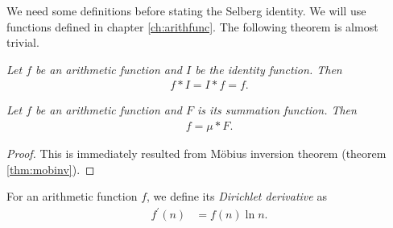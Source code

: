 \documentclass{subfile}
\begin{document}
	We need some definitions before stating the Selberg identity. We will use functions defined in chapter \eqref{ch:arithfunc}. The following theorem is almost trivial.
	\begin{theorem}\slshape
		Let $f$ be an arithmetic function and $I$ be the identity function. Then
			\begin{align*}
				f\ast I=I\ast f=f.
			\end{align*}
	\end{theorem}

	\begin{theorem}\slshape
		\label{thm:dirichmobi}
		Let $f$ be an arithmetic function and $F$ is its summation function. Then
			\begin{align*}
				f=\mu\ast F.
			\end{align*}
	\end{theorem}

	\begin{proof}
		This is immediately resulted from M\" obius inversion theorem (theorem \eqref{thm:mobinv}).
	\end{proof}

	\begin{definition}
		For an arithmetic function $f$, we define its \textit{Dirichlet derivative} as
			\begin{align*}
				f^\prime(n) & =f(n)\ln n.
			\end{align*}
	\end{definition}
\end{document}
